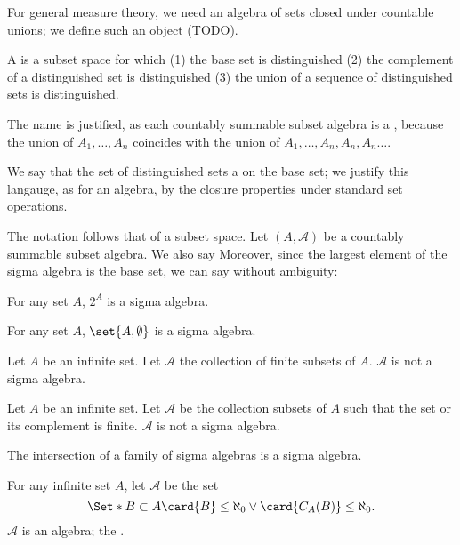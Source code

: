 

For general measure theory,
we need an algebra of sets
closed under countable unions;
we define such an object (TODO).


A 
is a subset space for which
(1) the base set is distinguished
(2) the complement of a distinguished
set is distinguished
(3) the union of a sequence of distinguished sets
is distinguished.

The name is justified, as
each countably summable subset algebra is a
,
because the union of $A_1, \dots, A_n$
coincides with the union of
$A_1, \dots, A_n, A_n, A_n \dots$.

We say that the set of distinguished
sets a  on the
base set; we justify this langauge, as for
an algebra, by the closure properties
under standard set operations.


The notation follows that of a subset space.
Let $(A, \mathcal{A})$ be a countably summable
subset algebra.
We also say 
Moreover, since the largest element of the
sigma algebra is the base set, we can say without
ambiguity: 


\begin{expl}
  For any set $A$, $2^{A}$ is a sigma algebra.
\end{expl}

\begin{expl}
  For any set $A$,
  $\set{A, \emptyset}$ is a sigma algebra.
\end{expl}

\begin{expl}
  Let $A$ be an infinite set.
  Let $\mathcal{A}$ the collection
  of finite subsets of $A$.
  $\mathcal{A}$ is not a sigma algebra.
\end{expl}

\begin{expl}
  Let $A$ be an infinite set.
  Let $\mathcal{A}$ be the collection
  subsets of $A$ such that the set or its
  complement is finite.
  $\mathcal{A}$ is not a sigma algebra.
\end{expl}


\begin{prop}
  The intersection of a family of sigma algebras is
  a sigma algebra.
  \label{sigma_algebra:sigmaintersection}
\end{prop}

\begin{expl}
  For any infinite set $A$,
  let $\mathcal{A}$ be the set
  $$
  \Set*{
    B \subset A
  }{
    \card{B} \leq \aleph_0 \lor
    \card{C_{A}(B)} \leq \aleph_0
  }.
  $$
  $\mathcal{A}$ is an algebra;
  the
  .
\end{expl}

